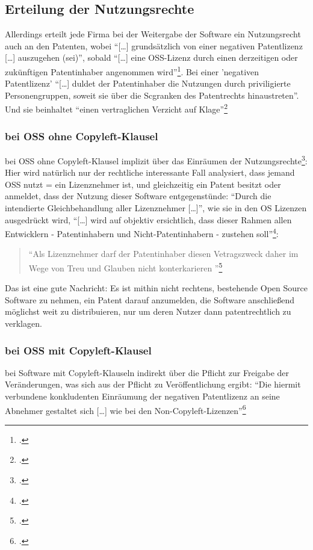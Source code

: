 \documentclass[DIV=calc,BCOR=5mm,11pt,headings=small,oneside,abstract=true, toc=bib]{scrartcl}
\begin{document}
\subsection{Erteilung der Nutzungsrechte}
Allerdings erteilt jede Firma bei der Weitergabe der Software ein Nutzungsrecht
auch an den Patenten, wobei \enquote{[\ldots] grundsätzlich von einer
negativen Patentlizenz [\ldots] auszugehen (sei)}, sobald \enquote{[\ldots]
eine OSS-Lizenz durch einen derzeitigen oder zukünftigen Patentinhaber
angenommen wird}\footcite[vgl.][79]{Suchomski2011a}. Bei einer
'negativen Patentlizenz' \enquote{[\ldots] duldet der Patentinhaber die
Nutzungen durch priviligierte Personengruppen, soweit sie über die
Scgranken des Patentrechts hinaustreten}. Und sie beinhaltet
\enquote{einen vertraglichen Verzicht auf
Klage}\footcite[vgl.][69]{Suchomski2011a}

\subsubsection{bei OSS ohne Copyleft-Klausel}
bei OSS ohne Copyleft-Klausel implizit über das Einräumen der
Nutzungsrechte\footcite[vgl.][117]{Suchomski2011a}: Hier wird  natürlich
nur der rechtliche interessante Fall analysiert, dass jemand OSS nutzt =
ein Lizenznehmer ist, und gleichzeitig ein Patent besitzt oder anmeldet, dass
der Nutzung dieser Software entgegenstünde: \enquote{Durch die intendierte
Gleichbehandlung aller Lizenznehmer [\ldots]}, wie sie in den OS Lizenzen
ausgedrückt wird, \enquote{[\ldots] wird auf objektiv ersichtlich, dass
dieser Rahmen allen Entwicklern - Patentinhabern und Nicht-Patentinhabern
- zustehen soll}\footcite[vgl.][118]{Suchomski2011a}: 

\begin{quote}
\enquote{Als Lizenznehmer darf der Patentinhaber diesen Vetragszweck daher im Wege
von Treu und Glauben nicht konterkarieren
}\footcite[][118]{Suchomski2011a}
\end{quote}

Das ist eine gute Nachricht: Es ist mithin nicht rechtens, bestehende Open
Source Software zu nehmen, ein Patent darauf anzumelden, die Software
anschließend möglichst weit zu distribuieren, nur um deren Nutzer dann
patentrechtlich zu verklagen.

\subsubsection{bei OSS mit Copyleft-Klausel}
bei Software mit Copyleft-Klauseln indirekt über die Pflicht zur Freigabe der
Veränderungen, was sich aus der Pflicht zu Veröffentlichung ergibt:
\enquote{Die hiermit verbundene konkludenten Einräumung der negativen
Patentlizenz an seine Abnehmer gestaltet sich [\ldots] wie bei den
Non-Copyleft-Lizenzen}\footcite[vgl.][118]{Suchomski2011a}
\end{document}
